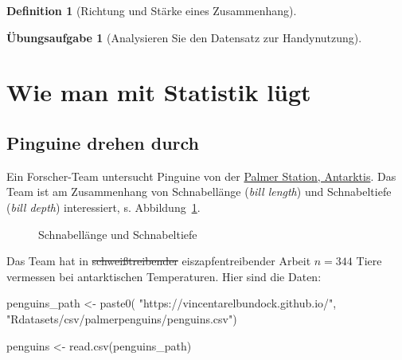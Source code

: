 \documentclass[
  a4paper,
  DIV=11]{scrreprt}
\newenvironment{Shaded}{\begin{snugshade}}{\end{snugshade}}
\newcommand{\FunctionTok}[1]{\textcolor[rgb]{0.28,0.35,0.67}{#1}}
\newcommand{\NormalTok}[1]{\textcolor[rgb]{0.00,0.23,0.31}{#1}}
\newcommand{\OtherTok}[1]{\textcolor[rgb]{0.00,0.23,0.31}{#1}}
\newcommand{\StringTok}[1]{\textcolor[rgb]{0.13,0.47,0.30}{#1}}
\theoremstyle{definition}
\newtheorem{exercise}{Übungsaufgabe}[chapter]
\theoremstyle{definition}
\theoremstyle{definition}
\newtheorem{definition}{Definition}[chapter]
\theoremstyle{remark}
\begin{document}
\begin{definition}[Richtung und Stärke eines
Zusammenhang]
\begin{exercise}[Analysieren Sie den Datensatz zur
Handynutzung]
\section{Wie man mit Statistik
lügt}\label{wie-man-mit-statistik-luxfcgt-5}

\subsection{Pinguine drehen durch}\label{pinguine-drehen-durch}

Ein Forscher-Team untersucht Pinguine von der
\href{https://pallter.marine.rutgers.edu/}{Palmer Station, Antarktis}.
Das Team ist am Zusammenhang von Schnabellänge (\emph{bill length}) und
Schnabeltiefe (\emph{bill depth}) interessiert, s.
Abbildung~\ref{fig-peng-bill}.

\begin{figure}


\caption{\label{fig-peng-bill}Schnabellänge und Schnabeltiefe}

\end{figure}%

Das Team hat in \st{schweißtreibender} eiszapfentreibender Arbeit
\(n=344\) Tiere vermessen bei antarktischen Temperaturen. Hier sind die
Daten:

\begin{Shaded}
\begin{Highlighting}[]
\NormalTok{penguins\_path }\OtherTok{\textless{}{-}} \FunctionTok{paste0}\NormalTok{(}
  \StringTok{"https://vincentarelbundock.github.io/"}\NormalTok{,}
  \StringTok{"Rdatasets/csv/palmerpenguins/penguins.csv"}\NormalTok{)}

\NormalTok{penguins }\OtherTok{\textless{}{-}} \FunctionTok{read.csv}\NormalTok{(penguins\_path)}
\end{Highlighting}
\end{Shaded}


\end{exercise}
\end{definition}
\end{document}
